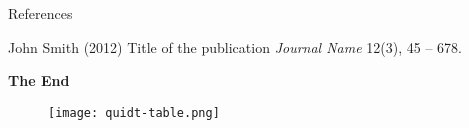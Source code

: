 \documentclass[aspectratio=169,xcolor=dvipsnames]{beamer}
\begin{document}

\begin{frame}{References}
    \footnotesize{
        \begin{thebibliography}{99}
             John Smith (2012)
            \newblock Title of the publication
            \newblock \emph{Journal Name} 12(3), 45 -- 678.
        \end{thebibliography}
    }
\end{frame}


\begin{frame}
    \Huge{\centerline{\textbf{The End}}}
\end{frame}



\begin{frame}[label=res-table]

    \begin{figure}[htbp]
        \centering
        \texttt{[image: quidt-table.png]} 
    \end{figure}
    \hyperlink{magnitudes}{}

\end{frame}
\end{document}
